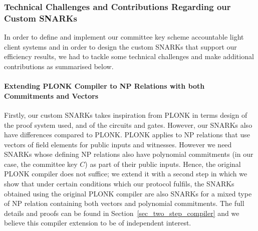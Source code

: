 \subsubsection{Technical Challenges and Contributions Regarding our Custom SNARKs} 
\label{sec:technical_challenges}

In order to define and implement our committee key scheme accountable light client systems and in order to design the custom SNARKs that support our efficiency results, 
we had to tackle some technical challenges and make additional contributions as summarised below.

\paragraph{Extending PLONK Compiler to NP Relations with both Commitments and Vectors} Firstly, our custom SNARKs takes inspiration from PLONK \cite{plonk} in terms design of the proof system used, 
and of the circuits and gates. However, our SNARKs also have differences compared to PLONK. PLONK applies to NP relations  that use  vectors of field elements for 
public inputs and witnesses.  However we need SNARKs whose defining NP relations also have  polynomial commitments (in our case, the committee key $C$) 
as part of their public inputs. Hence, the original PLONK compiler does not suffice; we extend it with a second step in which we show that under certain 
conditions which our protocol fulfils, the SNARKs obtained using the original PLONK compiler are also SNARKs for a mixed type of NP relation 
containing both vectors and polynomial commitments. The full details and proofs can be found in Section~\ref{sec_two_step_compiler} 
and we believe this compiler extension to be of independent interest. 

